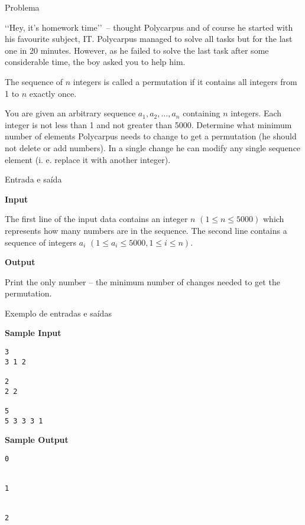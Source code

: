 
\begin{frame}[fragile]{Problema}

\lq\lq Hey, it's homework time\rq\rq\ -- thought Polycarpus and of course he started with his favourite subject, IT. Polycarpus managed to solve all tasks but for the last one in 20 minutes. However, as he failed to solve the last task after some considerable time, the boy asked you to help him.

The sequence of $n$ integers is called a permutation if it contains all integers from 1 to $n$ exactly once.

You are given an arbitrary sequence $a_1, a_2, \ldots, a_n$ containing $n$ integers. Each integer 
is not less than 1 and not greater than 5000. Determine what minimum number of elements Polycarpus needs to change to get a permutation (he should not delete or add numbers). In a single change he can modify any single sequence element (i. e. replace it with another integer).

\end{frame}

\begin{frame}[fragile]{Entrada e saída}

\textbf{Input}

The first line of the input data contains an integer $n$ $(1\leq n\leq 5000)$ which represents how 
many numbers are in the sequence. The second line contains a sequence of integers 
$a_i$ $(1\leq a_i\leq 5000, 1\leq i\leq n)$.

\textbf{Output}

Print the only number -- the minimum number of changes needed to get the permutation.

\end{frame}

\begin{frame}[fragile]{Exemplo de entradas e saídas}

\begin{minipage}[t]{0.5\textwidth}
\textbf{Sample Input}
\begin{verbatim}
3
3 1 2

2
2 2

5
5 3 3 3 1
\end{verbatim}
\end{minipage}
\begin{minipage}[t]{0.45\textwidth}
\textbf{Sample Output}
\begin{verbatim}
0


1


2


\end{verbatim}
\end{minipage}
\end{frame}

